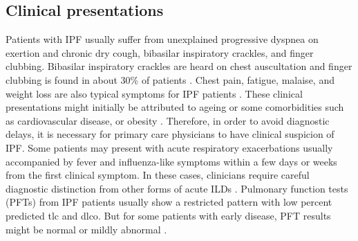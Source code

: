 \subsection{Clinical presentations}
Patients with IPF usually suffer from unexplained progressive dyspnea on exertion and chronic dry cough, bibasilar inspiratory crackles, and finger clubbing. Bibasilar inspiratory crackles are heard on chest auscultation and finger clubbing is found in about 30\% of patients \citep{raghu2011official,king2011idiopathic,richeldi2017idiopathic}. Chest pain, fatigue, malaise, and weight loss are also typical symptoms for IPF patients \citep{douglas2000idiopathic, king2001predicting}. These clinical presentations might initially be attributed to ageing or some comorbidities such as cardiovascular disease, or obesity \citep{richeldi2017idiopathic}. Therefore, in order to avoid diagnostic delays, it is necessary for primary care physicians to have clinical suspicion of IPF. Some patients may present with acute respiratory exacerbations usually accompanied by fever and influenza-like symptoms within a few days or weeks from the first clinical symptom. In these cases, clinicians require careful diagnostic distinction from other forms of acute ILDs \citep{richeldi2017idiopathic}. Pulmonary function tests (PFTs) from IPF patients usually show a restricted pattern with low percent predicted \gls{tlc} and \gls{dlco}. But for some patients with early disease, PFT results might be normal or mildly abnormal \citep{douglas2000idiopathic,raghu2006incidence}.

